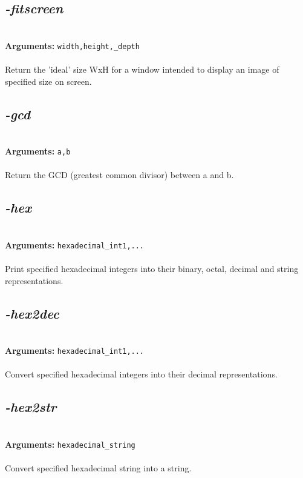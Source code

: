 \documentclass[a4paper,11pt,twoside]{book}
\begin{document}
\subsection{\emph{-fitscreen} }\vspace*{-0.5em}
~\\\textbf{Arguments: } 
{\small \texttt{width,height,\_depth}}\\~\\
Return the 'ideal' size WxH for a window intended to display an image of specified size on screen.


\subsection{\emph{-gcd} }\vspace*{-0.5em}
~\\\textbf{Arguments: } 
{\small \texttt{a,b}}\\~\\
Return the GCD (greatest common divisor) between a and b.


\subsection{\emph{-hex} }\vspace*{-0.5em}
~\\\textbf{Arguments: } 
{\small \texttt{hexadecimal\_int1,...}}\\~\\
Print specified hexadecimal integers into their binary, octal, decimal and string representations.


\subsection{\emph{-hex2dec} }\vspace*{-0.5em}
~\\\textbf{Arguments: } 
{\small \texttt{hexadecimal\_int1,...}}\\~\\
Convert specified hexadecimal integers into their decimal representations.


\subsection{\emph{-hex2str} }\vspace*{-0.5em}
~\\\textbf{Arguments: } 
{\small \texttt{hexadecimal\_string}}\\~\\
Convert specified hexadecimal string into a string.
\end{document}
